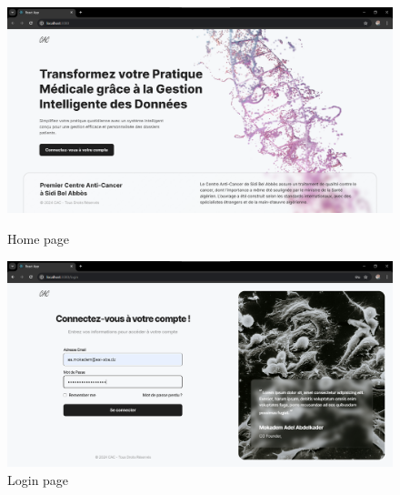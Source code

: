 \documentclass[
11pt, %
english, %
singlespacing, %
headsepline, %
]{project_structure}
\begin{document}
\begin{figure}[H]
    \centering
    \begin{minipage}{0.49\textwidth}
        \centering
        \includegraphics[width=1\linewidth]{figures/SI/web/home.png}
        \caption{Home page}
        \label{fig:home}
    \end{minipage}
    \hfill
    \begin{minipage}{0.49\textwidth}
        \centering
        \includegraphics[width=1\linewidth]{figures/SI/web/signin.png}
        \caption{Login page}
        \label{fig:signin}
    \end{minipage}
\end{figure}
\end{document}
